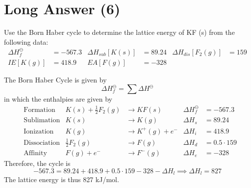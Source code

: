 \documentclass[answers]{exam}
\begin{document}
\section{Long Answer (6)}
\begin{questions}

\question Use the Born Haber cycle to determine the lattice energy of KF (s) from the following data:
\begin{align*}
  \Delta H_f^\ominus &= - 567.3 & \Delta H_{sub} [K(s)] &= 89.24 & \Delta H_{dis} [F_2(g)] &= 159 \\
  IE[K(g)] &= 418.9 & EA[F(g)] &= -328
\end{align*}
%
\begin{solutionbox}{3.2in}
  The Born Haber Cycle is given by \begin{equation*}
    \Delta H_f^\ominus = \sum \Delta H^\ominus
  \end{equation*}
  in which the enthalpies are given by
  \begin{align*}
    & \text{Formation} & K(s) + \textstyle\frac{1}{2} F_2(g) &\to KF(s) & \Delta H_f^\ominus &= -567.3 \\
    & \text{Sublimation} & K(s) &\to K(g) & \Delta H_s &= 89.24 \\
    & \text{Ionization} & K(g) &\to K^+(g) + e^- & \Delta H_i &= 418.9 \\
    & \text{Dissociation} & \textstyle\frac{1}{2} F_2 (g) &\to F(g) & \Delta H_d &= 0.5 \cdot 159 \\
    & \text{Affinity} & F(g) + e^- &\to F^- (g) & \Delta H_e &= -328
  \end{align*}
  Therefore, the cycle is \begin{equation*}
    -567.3 = 89.24 + 418.9 + 0.5 \cdot 159 - 328 - \Delta H_l \implies \Delta H_l = 827
  \end{equation*}
  The lattice energy is thus 827 kJ/mol.
\end{solutionbox}


\end{questions}
\end{document}
